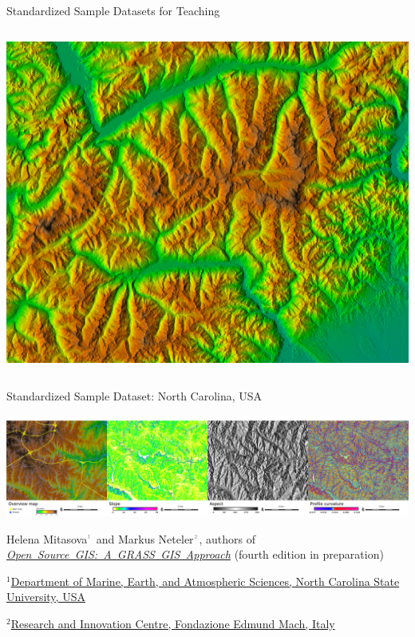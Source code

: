 \documentclass[xcolor={dvipsnames,usenames},beamer,aspectratio=169]{beamer}
\newcommand{\n}[1]{$^{\textcolor{gray}{\mbox{\tiny{#1}}}}$}
\begin{document}
\begin{frame}[fragile]{Standardized Sample Datasets for Teaching}
\begin{columns}[c]
 \includegraphics[width=\textwidth]{./images/dataset/std_dataset_piemonte_shaded_elevation}%
\end{columns}


\end{frame}



\begin{frame}{Standardized Sample Dataset: North Carolina, USA}

\begin{center}
\includegraphics[width=\textwidth]{./images/dataset/std_dataset_nc_stripe.png}
\end{center}


Helena Mitasova\n{1} and Markus Neteler\n{2}, authors of
\mbox{\href{http://grassbook.org/}{\it Open Source GIS: A GRASS GIS Approach}}
{\scriptsize (fourth edition in preparation)}

\bigskip

{\scriptsize
$^1$\href{http://www.meas.ncsu.edu/}%
{Department of Marine, Earth, and Atmospheric Sciences,
North Carolina State University, USA}

$^2$\href{http://gis.cri.fmach.it/}%
{Research and Innovation Centre, Fondazione Edmund Mach, Italy}
}

\end{frame}
\end{document}
